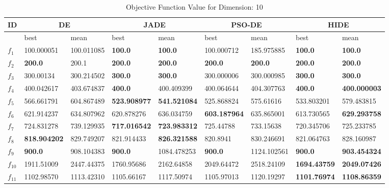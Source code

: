 \begingroup
\renewcommand\arraystretch{0.7}
\begin{table*}[t!]
\centering
\caption{Objective Function Value for Dimension: 10}
\vspace{-3mm}
 \begin{tabular}{|p{0.8cm}|p{1.6cm}|p{1.6cm}|p{1.6cm}|p{1.6cm}|p{1.6cm}|p{1.6cm}|p{1.6cm}|p{1.6cm}|} 
 \hline
 ID & \multicolumn{2}{c|}{DE} & \multicolumn{2}{c|}{JADE} & \multicolumn{2}{c|}{PSO-DE} & \multicolumn{2}{c|}{HIDE} \\
 \hline
    & best & mean & best & mean & best & mean & best & mean \\ [0.5ex] 
 \hline
$f_1$  & 100.000051 & 100.011085 & \textbf{100.0} & \textbf{100.0} & 100.000712 & 185.975885 & \textbf{100.0} & \textbf{100.0} \\ 
$f_2$  & \textbf{200.0} & 200.1 & \textbf{200.0} & \textbf{200.0} & \textbf{200.0} & \textbf{200.0} & \textbf{200.0} & \textbf{200.0} \\ 
$f_3$  & 300.00134 & 300.214502 & \textbf{300.0} & \textbf{300.0} & 300.000006 & 300.000985 & \textbf{300.0} & \textbf{300.0} \\ 
$f_4$  & 400.042617 & 403.674837 & \textbf{400.0} & 400.409399 & 400.064644 & 404.307763 & \textbf{400.0} & \textbf{400.000003} \\ 
$f_5$  & 566.661791 & 604.867489 & \textbf{523.908977} & \textbf{541.521084} & 525.868824 & 575.61616 & 533.803201 & 579.483815 \\ 
$f_6$  & 621.914237 & 634.807962 & 620.878276 & 636.034759 & \textbf{603.187964} & 635.865001 & 613.730565 & \textbf{629.293758} \\ 
$f_7$  & 724.831278 & 739.129935 & \textbf{717.016542} & \textbf{723.983312} & 725.44788 & 733.15638 & 720.345706 & 725.233785 \\ 
$f_8$  & \textbf{818.904202} & 829.749207 & 821.914433 & \textbf{826.321588} & 820.8941 & 830.246691 & 821.064763 & 828.160987 \\ 
$f_9$  & \textbf{900.0} & 908.104383 & \textbf{900.0} & 1084.478253 & \textbf{900.0} & 1124.102561 & \textbf{900.0} & \textbf{903.454324} \\ 
$f_{10}$  & 1911.51009 & 2447.44375 & 1760.95686 & 2162.64858 & 2049.64472 & 2518.24109 & \textbf{1694.43759} & \textbf{2049.07426} \\ 
$f_{11}$  & 1102.98570 & 1113.42310 & 1105.66167 & 1117.50974 & 1105.97013 & 1120.19297 & \textbf{1101.76974} & \textbf{1108.86359} \\ 

\end{tabular}
\end{table*}
